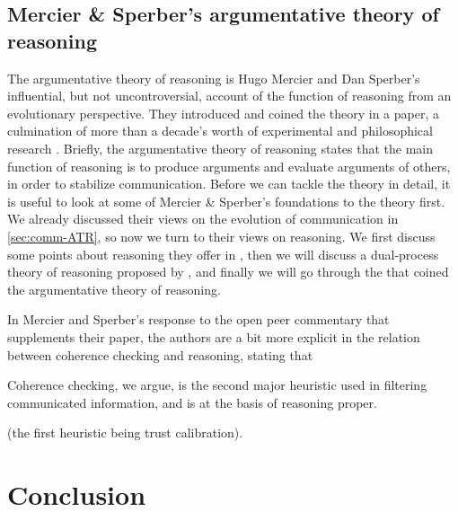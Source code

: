 \subsection{Mercier \& Sperber's argumentative theory of reasoning}
\label{sec:MS11}

The argumentative theory of reasoning is Hugo Mercier and Dan Sperber's influential, but not uncontroversial, account of the function of reasoning from an evolutionary perspective. They introduced and coined the theory in a \citeyear{MS11} paper, a culmination of more than a decade's worth of experimental and philosophical research \citep{Sperber01, Sperber10, MS09, Sperber00}.
Briefly, the argumentative theory of reasoning states that the main function of reasoning is to produce arguments and evaluate arguments of others, in order to stabilize communication.
Before we can tackle the theory in detail, it is useful to look at some of Mercier \& Sperber's foundations to the theory first. We already discussed their views on the evolution of communication in \cref{sec:comm-ATR}, so now we turn to their views on reasoning. We first discuss some points about reasoning they offer in \citet{Sperber01,Sperber10}, then we will discuss a dual-process theory of reasoning proposed by \citet{MS09}, and finally we will go through the \citeyear{MS11} that coined the argumentative theory of reasoning.

In Mercier and Sperber's response to the open peer commentary that supplements their paper, the authors are a bit more explicit in the relation between coherence checking and reasoning, stating that
\begin{quoting}
    Coherence checking, we argue, is the second major heuristic used in filtering communicated information, and is at the basis of reasoning proper.
    \hfill \citep[p.~96]{MS11}
\end{quoting}
(the first heuristic being trust calibration).

\section{Conclusion}
